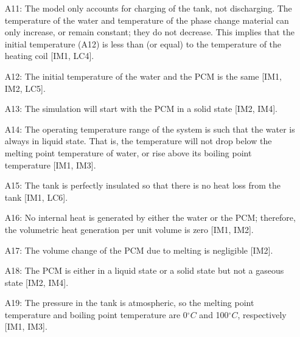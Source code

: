 \documentclass[12pt]{article}
\begin{document}
\begin{itemize}
\item[A11:]The model only accounts for charging of the tank, not discharging. The temperature of the water and temperature of the phase change material can only increase, or remain constant; they do not decrease. This implies that the initial temperature (A12) is less than (or equal) to the temperature of the heating coil [IM1, LC4].
\item[A12:]The initial temperature of the water and the PCM is the same [IM1, IM2, LC5].
\item[A13:]The simulation will start with the PCM in a solid state [IM2, IM4].
\item[A14:]The operating temperature range of the system is such that the water is always in liquid state. That is, the temperature will not drop below the melting point temperature of water, or rise above its boiling point temperature [IM1, IM3].
\item[A15:]The tank is perfectly insulated so that there is no heat loss from the tank [IM1, LC6].
\item[A16:]No internal heat is generated by either the water or the PCM; therefore, the volumetric heat generation per unit volume is zero [IM1, IM2].
\item[A17:]The volume change of the PCM due to melting is negligible [IM2].
\item[A18:]The PCM is either in a liquid state or a solid state but not a gaseous state [IM2, IM4].
\item[A19:]The pressure in the tank is atmospheric, so the melting point temperature and boiling point temperature are 0${}^{\circ}C$ and 100${}^{\circ}C$, respectively [IM1, IM3].
\end{itemize}
\end{document}
